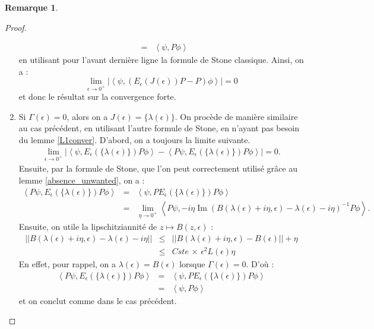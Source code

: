 \documentclass[12pt,openany,a4paper, titlepage]{article}
\newcommand{\lp}{\left(}
\newcommand{\rp}{\right)}
\newcommand{\la}{\left\langle}
\newcommand{\ra}{\right\rangle}
\newcommand{\im}{\operatorname{Im}}
\theoremstyle{definition}
\theoremstyle{definition}
\theoremstyle{definition}
\theoremstyle{definition}
\theoremstyle{definition}
\newtheorem{rem}{Remarque}
\theoremstyle{definition}
\begin{document}
\begin{rem}
\begin{proof}
\begin{enumerate}
\begin{eqnarray}
    &=& \la \psi, P\phi\ra 
\end{eqnarray}
en utilisant pour l'avant dernière ligne la formule de Stone classique.
Ainsi, on a :
\begin{equation}
    \lim\limits_{\epsilon\rightarrow 0^+}\left|\la \psi , (E_{\epsilon} (J(\epsilon))P - P)\phi \ra  \right|= 0 
\end{equation}
et donc le résultat sur la convergence forte.
\item Si $\Gamma(\epsilon) = 0$, alors on a $J(\epsilon) = \{\lambda(\epsilon)\}$. On procède de manière similaire au cas précédent, en utilisant l'autre formule de Stone, en n'ayant pas besoin du lemme \ref{L1conver}.
D'abord, on a toujours la limite suivante.
\begin{eqnarray}
    \lim\limits_{\epsilon\rightarrow 0^+}\left|\la \psi , E_{\epsilon} (\{\lambda(\epsilon)\})P \phi \ra\right. - \left. \la P\psi , E_{\epsilon} (\{\lambda(\epsilon)\})P \phi \ra \right| = 0.
    \end{eqnarray}
Ensuite, par la formule de Stone, que l'on peut correctement utilisé grâce au lemme \ref{absence_unwanted}, on a :
\begin{eqnarray}
    \la P\psi , E_{\epsilon} (\{\lambda(\epsilon)\})P \phi \ra &=&\la \psi , PE_{\epsilon} (\{\lambda(\epsilon)\})P \phi \ra \\
    &=& \lim\limits_{\eta\rightarrow 0^+} \la P\psi, -i\eta \im\lp B(\lambda(\epsilon) + i\eta,\epsilon) - \lambda(\epsilon) - i\eta \rp^{-1} P\phi \ra.
\end{eqnarray}
Ensuite, on utile la lipschitziannité de $z\mapsto B(z,\epsilon)$ :
\begin{eqnarray}
     || B(\lambda(\epsilon) + i\eta,\epsilon) - \lambda(\epsilon) - i\eta|| &\leq& || B(\lambda(\epsilon) + i\eta,\epsilon) - B(\epsilon) || + \eta \\
     &\leq& Cste \, \times \, \epsilon^2L(\epsilon) \eta
\end{eqnarray}
En effet, pour rappel, on a $\lambda(\epsilon) = B(\epsilon)$ lorsque $\Gamma(\epsilon) = 0$. D'où :
\begin{eqnarray}
    \la P\psi , E_{\epsilon} (\{\lambda(\epsilon)\})P \phi \ra &=&\la \psi , PE_{\epsilon} (\{\lambda(\epsilon)\})P \phi \ra \\
    &=& \la \psi, P\phi\ra
\end{eqnarray}
et on conclut comme dans le cas précédent.
\end{enumerate}
\end{proof}


\end{rem}
\end{document}

